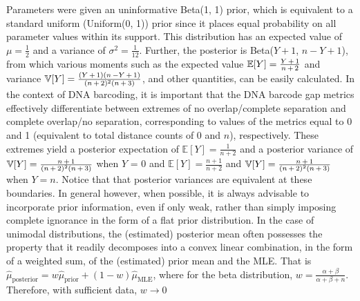 \documentclass[12pt]{article}
\begin{document}
Parameters were given an uninformative Beta(1, 1) prior, which is equivalent to a standard uniform (Uniform(0, 1)) prior since it places equal probability on all parameter values within its support. This distribution has an expected value of $\mu = \frac{1}{2}$ and a variance of $\sigma^2 = \frac{1}{12}$. Further, the posterior is Beta($Y + 1$, $n - Y + 1$), from which various moments such as the expected value $\mathbb{E}[Y] = \frac{Y \hspace{0.5mm} + \hspace{0.5mm} 1}{n \hspace{0.5mm} + \hspace{0.5mm} 2}$ and variance $\mathbb{V}[Y] = \frac{(Y \hspace{0.5mm} + \hspace{0.5mm} 1)(n \hspace{0.5mm} - Y \hspace{0.5mm} + \hspace{0.5mm} 1)}{(n \hspace{0.5mm} + \hspace{0.5mm} 2)^2(n \hspace{0.5mm} + \hspace{0.5mm} 3)}$, and other quantities, can be easily calculated. In the context of DNA barcoding, it is important that the DNA barcode gap metrics effectively differentiate between extremes of no overlap/complete separation and complete overlap/no separation, corresponding to values of the metrics equal to 0 and 1 (equivalent to total distance counts of 0 and $n$), respectively. These extremes yield a posterior expectation of $\mathbb{E}[Y] = \frac{1}{n + 2}$ and a posterior variance of $\mathbb{V}[Y] = \frac{n \hspace{0.5mm} + \hspace{0.5mm} 1}{(n \hspace{0.5mm} + \hspace{0.5mm} 2)^2(n \hspace{0.5mm} + \hspace{0.5mm} 3)}$ when $Y$ = 0 and $\mathbb{E}[Y] = \frac{n + 1}{n + 2}$ and $\mathbb{V}[Y] = \frac{n \hspace{0.5mm} + \hspace{0.5mm} 1}{(n \hspace{0.5mm} + \hspace{0.5mm} 2)^2(n \hspace{0.5mm} + \hspace{0.5mm} 3)}$ when $Y = n$. Notice that that posterior variances are equivalent at these boundaries. In general however, when possible, it is always advisable to incorporate prior information, even if only weak, rather than simply imposing complete ignorance in the form of a flat prior distribution. In the case of unimodal distributions, the (estimated) posterior mean often possesses the property that it readily decomposes into a convex linear combination, in the form of a weighted sum, of the (estimated) prior mean and the MLE. That is $\hat{\mu}_\mathrm{posterior} = w\hat{\mu}_\mathrm{prior} + (1-w)\hat{\mu}_\mathrm{MLE}$, where for the beta distribution, $w = \frac{\alpha + \beta}{\alpha + \beta + n}$. Therefore, with sufficient data, $w \rightarrow 0$ 
\end{document}
